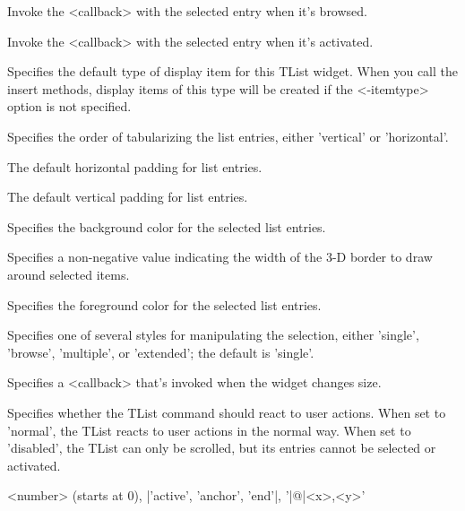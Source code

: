 \vskip5pt
\begin{enum}{1cm}


 Invoke the <callback> with the selected entry
when it's browsed.

 Invoke the <callback> with the selected entry
when it's activated.

Specifies the default type of display item for this
TList widget. When you call the insert methods,
display items of this type will be created if the
<-itemtype> option is not specified.

Specifies the order of tabularizing the list entries, either
'vertical' or 'horizontal'.

The default horizontal padding for list entries.

The default vertical padding for list entries.

Specifies the background color for the selected list entries.

Specifies a non-negative value indicating the width of
the 3-D border to draw around selected items.

Specifies the foreground color for the selected list entries.

Specifies one of several styles for manipulating the
selection, either 'single', 'browse', 'multiple', or 'extended';
the default is 'single'.

Specifies a <callback> that's invoked when the widget changes size.

Specifies whether the TList command should react to
user actions. When set to 'normal', the TList reacts
to user actions in the normal way. When set to
'disabled', the TList can only be scrolled, but its
entries cannot be selected or activated.

<number> (starts at 0), |'active', 'anchor', 'end'|, '|@|<x>,<y>'

\end{enum}

\vskip5pt

